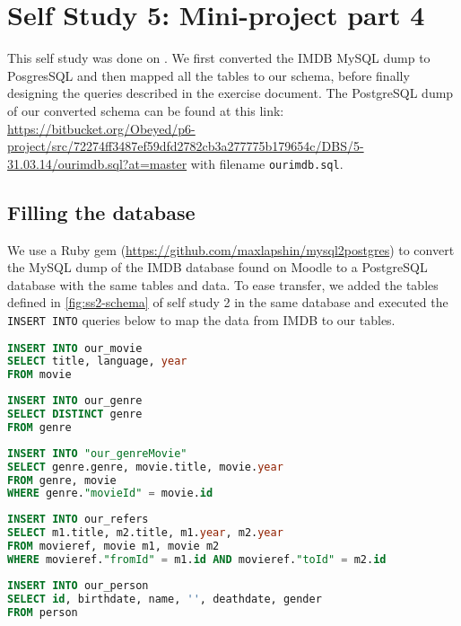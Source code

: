 \section{Self Study 5: Mini-project part 4}
This self study was done on . We first converted the IMDB MySQL dump to PosgresSQL and then mapped all the tables to our schema, before finally designing the queries described in the exercise document. The PostgreSQL dump of our converted schema can be found at this link: \url{https://bitbucket.org/Obeyed/p6-project/src/72274ff3487ef59dfd2782cb3a277775b179654c/DBS/5-31.03.14/ourimdb.sql?at=master} with filename \texttt{ourimdb.sql}.

\subsection{Filling the database}
We use a Ruby gem (\url{https://github.com/maxlapshin/mysql2postgres}) to convert the MySQL dump of the IMDB database found on Moodle to a PostgreSQL database with the same tables and data. To ease transfer, we added the tables defined in \cref{fig:ss2-schema} of self study 2 in the same database and executed the \texttt{INSERT INTO} queries below to map the data from IMDB to our tables.

\begin{lstlisting}[language=SQL]
INSERT INTO our_movie
SELECT title, language, year
FROM movie
\end{lstlisting}

\begin{lstlisting}[language=SQL]
INSERT INTO our_genre
SELECT DISTINCT genre
FROM genre
\end{lstlisting}

\begin{lstlisting}[language=SQL]
INSERT INTO "our_genreMovie"
SELECT genre.genre, movie.title, movie.year
FROM genre, movie
WHERE genre."movieId" = movie.id
\end{lstlisting}

\begin{lstlisting}[language=SQL]
INSERT INTO our_refers
SELECT m1.title, m2.title, m1.year, m2.year
FROM movieref, movie m1, movie m2
WHERE movieref."fromId" = m1.id AND movieref."toId" = m2.id
\end{lstlisting}

\begin{lstlisting}[language=SQL]
INSERT INTO our_person
SELECT id, birthdate, name, '', deathdate, gender
FROM person
\end{lstlisting}

